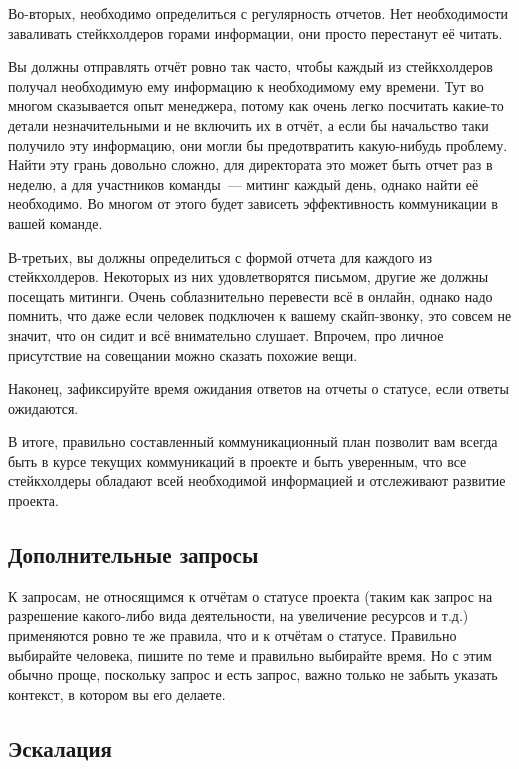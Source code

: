\documentclass{../../text-style}
\begin{document}
Во-вторых, необходимо определиться с регулярность отчетов. Нет необходимости заваливать стейкхолдеров горами информации, они просто перестанут её читать.

Вы должны отправлять отчёт ровно так часто, чтобы каждый из стейкхолдеров получал необходимую ему информацию к необходимому ему времени. Тут во многом сказывается опыт менеджера, потому как очень легко посчитать какие-то детали незначительными и не включить их в отчёт, а если бы начальство таки получило эту информацию, они могли бы предотвратить какую-нибудь проблему. Найти эту грань довольно сложно, для директората это может быть отчет раз в неделю, а для участников команды~--- митинг каждый день, однако найти её необходимо. Во многом от этого будет зависеть эффективность коммуникации в вашей команде.

В-третьих, вы должны определиться с формой отчета для каждого из стейкхолдеров. Некоторых из них удовлетворятся письмом, другие же должны посещать митинги. Очень соблазнительно перевести всё в онлайн, однако надо помнить, что даже если человек подключен к вашему скайп-звонку, это совсем не значит, что он сидит и всё внимательно слушает. Впрочем, про личное присутствие на совещании можно сказать похожие вещи.

Наконец, зафиксируйте время ожидания ответов на отчеты о статусе, если ответы ожидаются.

В итоге, правильно составленный коммуникационный план позволит вам всегда быть в курсе текущих коммуникаций в проекте и быть уверенным, что все стейкхолдеры обладают всей необходимой информацией и отслеживают развитие проекта.

\subsection{Дополнительные запросы}

К запросам, не относящимся к отчётам о статусе проекта (таким как запрос на разрешение какого-либо вида деятельности, на увеличение ресурсов и т.д.) применяются ровно те же правила, что и к отчётам о статусе. Правильно выбирайте человека, пишите по теме и правильно выбирайте время. Но с этим обычно проще, поскольку запрос и есть запрос, важно только не забыть указать контекст, в котором вы его делаете. 

\subsection{Эскалация}
\end{document}
